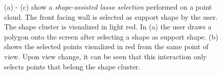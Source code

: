 \begin{figure}
\centering
{}\par\medskip
{}\par\medskip        
{}
\caption[Screenshots of the workflow of a shape-assisted lasso selection. (a) shows the lasso and the support shape, (b) the selected points, (c) shows that only points are selected on the support shape.]
{(a) - (c) show a \textit{shape-assisted lasso selection} performed on a point cloud. The front facing wall is selected as support shape by the user. The shape cluster is visualized in light red. In (a) the user draws a polygon onto the screen after selecting a shape as support shape. (b) shows the selected points visualized in red from the same point of view. Upon view change, it can be seen that this interaction only selects points that belong the shape cluster. }
\label{fig:lasso_assisted}
\end{figure}


